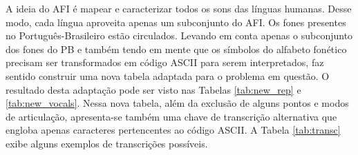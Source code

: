 A ideia do AFI é mapear e caracterizar todos os sons das línguas humanas. Desse modo, cada língua aproveita apenas um subconjunto do AFI. Os fones presentes no Português-Brasileiro estão circulados. Levando em conta apenas o subconjunto dos fones do PB e também tendo em mente que os símbolos do alfabeto fonético precisam ser transformados em código ASCII para serem interpretados, faz sentido construir uma nova tabela adaptada para o problema em questão. O resultado desta adaptação pode ser visto nas Tabelas \ref{tab:new_rep} e \ref{tab:new_vocals}. Nessa nova tabela, além da exclusão de alguns pontos e modos de articulação, apresenta-se também uma chave de transcrição alternativa que engloba apenas caracteres pertencentes ao código ASCII. A Tabela \ref{tab:transc} exibe alguns exemplos de transcrições possíveis.  


